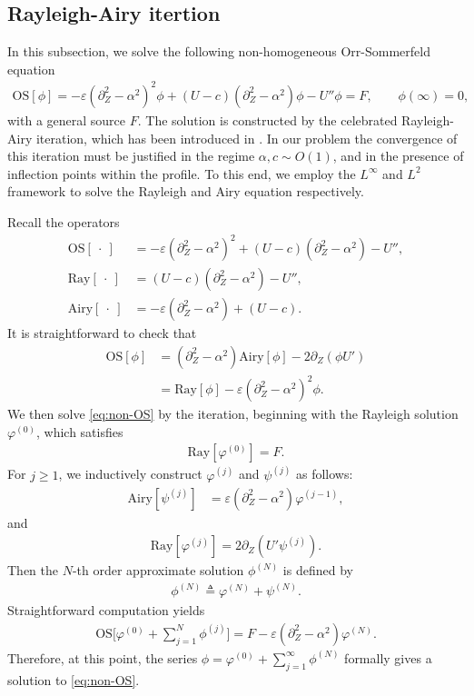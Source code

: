\documentclass[reqno,11pt]{amsart}
\numberwithin{equation}{section}
\numberwithin{equation}{section}
\theoremstyle{plain}
\begin{document}
\subsection{Rayleigh-Airy itertion}
In this subsection, we solve the following non-homogeneous Orr-Sommerfeld equation 
\begin{align}\label{eq:non-OS}
    \mathrm{OS}[\phi]=-\varepsilon (\partial_Z^2-\alpha^2)^2\phi +(U-c)(\partial_Z^2-\alpha^2)\phi-U''\phi=F, \qquad \phi(\infty)=0,
\end{align}
with a general source $F$. The solution is constructed by the celebrated Rayleigh-Airy iteration, which has been introduced in \cite{GGN-DMJ, GMM-duke}. In our problem the convergence of this iteration must be justified in the regime $\alpha,c\sim O(1)$, and in the presence of inflection points within the profile. To this end, we employ the $L^\infty$ and $L^2$ framework to solve the Rayleigh and Airy equation respectively.

Recall the operators 
\begin{align*}
	\mathrm{OS}[~\cdot~]&= -\varepsilon (\partial_Z^2-\alpha^2)^2 +(U-c)(\partial_Z^2-\alpha^2)-U'',\\
	\mathrm{Ray}[~\cdot~]&=(U-c)(\partial_Z^2-\alpha^2)-U'',\\
	\mathrm{Airy}[~\cdot~]&=-\varepsilon (\partial_Z^2-\alpha^2)+(U-c).
\end{align*}
It is straightforward to check that 
\begin{align*}
	\mathrm{OS}[\phi]&= (\partial_Z^2-\alpha^2)\mathrm{Airy}[\phi]-2\partial_Z(\phi U')\\
	&=\mathrm{Ray}[\phi]-\varepsilon (\partial_Z^2-\alpha^2)^2\phi.
\end{align*}
We then solve \eqref{eq:non-OS} by the iteration, beginning with the Rayleigh solution $\varphi^{(0)}$, which satisfies
\begin{align}\label{eq:iter1-1}
    \mathrm{Ray}[\varphi^{(0)}]=F.
\end{align}
For $j\geq 1$, we inductively construct $\varphi^{(j)}$ and $\psi^{(j)}$  as follows:
\begin{align}\label{eq:iter2-1}
	\mathrm{Airy}[\psi^{(j)}] &=\varepsilon (\partial_Z^2-\alpha^2)\varphi^{(j-1)},
\end{align}
and
\begin{align} \label{eq:iter2-2} 
\mathrm{Ray}[\varphi^{(j)}]=2\partial_Z(U'\psi^{(j)}).
\end{align}
Then the $N$-th order approximate solution $\phi^{(N)}$ is defined by
\begin{align*}
    \phi^{(N)} \triangleq\varphi^{(N)}+\psi^{(N)}.
\end{align*}
Straightforward computation yields
\begin{align*}
    \mathrm{OS}\Big[\varphi^{(0)}+\sum_{j=1}^N \phi^{(j)}\Big]=F-\varepsilon(\partial_Z^2-\alpha^2)\varphi^{(N)}.
\end{align*}
Therefore, at this point, the series $\displaystyle\phi=\varphi^{(0)}+\sum_{j=1}^\infty \phi^{(N)}$ formally gives a solution to \eqref{eq:non-OS}. 
\end{document}
